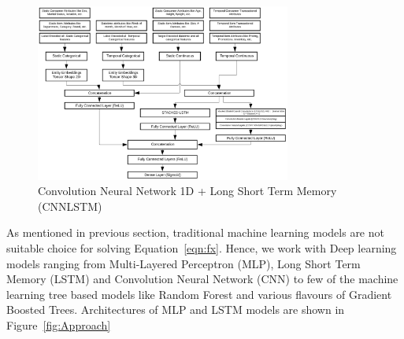   \begin{figure}[t]
    \centering 
    \includegraphics[width=3.3in]{img/CNNLSTM.png} 
    \caption{Convolution Neural Network 1D + Long Short Term Memory (CNNLSTM)} 
    \label{fig:CNNLSTM} 
  \end{figure}

As mentioned in previous section, traditional machine learning models are not suitable choice for solving Equation~\ref{eqn:fx}. 
Hence, we work with Deep learning models ranging from Multi-Layered Perceptron (MLP), Long Short 
Term Memory (LSTM) and Convolution Neural Network (CNN) to few of the machine learning tree based models like Random 
Forest and various flavours of Gradient Boosted Trees. Architectures of MLP and LSTM models are shown in Figure~\ref{fig:Approach}
